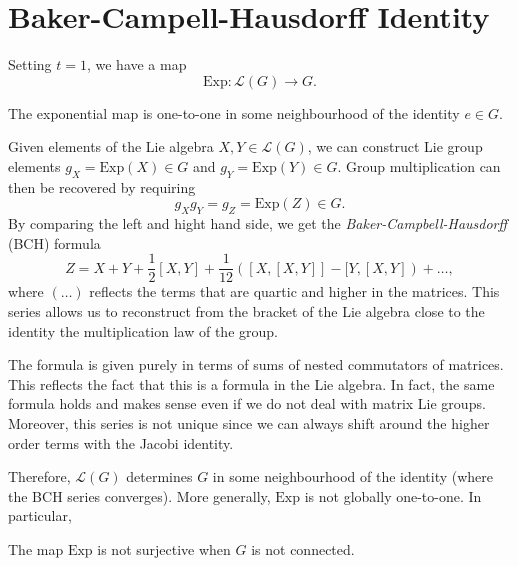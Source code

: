 
\section{Baker-Campell-Hausdorff Identity}%
\label{sec:baker_campell_hausdorff_identity}

Setting $t = 1$, we have a map
\begin{equation}
  \text{Exp}\colon \mathscr{L}(G) \to G.
\end{equation}
\begin{claim}
  The exponential map is one-to-one in some neighbourhood of the identity $e\in G$.
\end{claim}
Given elements of the Lie algebra $X, Y \in \mathscr{L}(G)$, we can construct Lie group elements $g_X = \text{Exp}(X) \in G$ and $g_Y = \text{Exp}(Y) \in G$.
Group multiplication can then be recovered by requiring
\begin{equation}
  g_X g_Y = g_Z = \text{Exp}(Z) \in G.
\end{equation}
By comparing the left and hight hand side, we get the \emph{Baker-Campbell-Hausdorff} (BCH) formula
\begin{equation}
  \label{eq:BCH-formula}
  Z = X + Y + \frac{1}{2}[X, Y] + \frac{1}{12}([X, [X, Y]] - [Y, [X, Y]) + \dots,
\end{equation}
where $(\dots)$ reflects the terms that are quartic and higher in the matrices.
This series allows us to reconstruct from the bracket of the Lie algebra close to the identity the multiplication law of the group.
\begin{leftbar}
  \begin{remark}
    The formula is given purely in terms of sums of nested commutators of matrices. This reflects the fact that this is a formula in the Lie algebra. In fact, the same formula holds and makes sense even if we do not deal with matrix Lie groups.
    Moreover, this series is not unique since we can always shift around the higher order terms with the Jacobi identity.
  \end{remark}
\end{leftbar}
Therefore, $\mathscr{L}(G)$ determines $G$ in some neighbourhood of the identity (where the BCH series converges). More generally, $\text{Exp}$ is not globally one-to-one. In particular,
\begin{claim}
  The map $\text{Exp}$ is not surjective when $G$ is not connected.
\end{claim}
